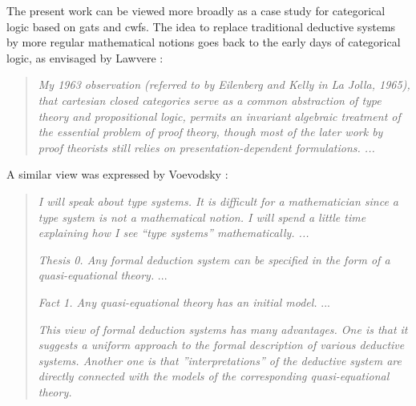 \documentclass[submission,copyright,creativecommons]{eptcs}
\newcommand{\ERASER}[1]{}
\begin{document}
The present work can be viewed more broadly as a case study for categorical logic based on gats and cwfs. The idea to replace traditional deductive systems by more regular mathematical notions goes back to the early days of categorical logic, as envisaged by Lawvere \cite{lawvere:tac-adjointness}:
\begin{quotation}
\emph{
My 1963 observation (referred to by Eilenberg and Kelly in La Jolla, 1965), that cartesian closed categories serve as a common abstraction of type theory and propositional
logic, permits an invariant algebraic treatment of the essential problem of proof theory,
though most of the later work by proof theorists still relies on presentation-dependent
formulations. ...
}
\end{quotation}
A similar view was expressed by Voevodsky \cite{voevodsky:cmu2010}:
\begin{quotation}
\emph{
I will speak about type systems. It is diﬃcult for a mathematician since
a type system is not a mathematical notion. I will spend a little time
explaining how I see ``type systems” mathematically. ...}

\emph{Thesis 0. Any formal deduction system can be specified in the form of a
quasi-equational theory.} ...

\emph{Fact 1. Any quasi-equational theory has an initial model.} ...

\emph{This view of formal deduction systems has many advantages. One is that it
suggests a uniform approach to the formal description of various deductive
systems. Another one is that ”interpretations” of the deductive system are
directly connected with the models of the corresponding quasi-equational
theory.}
\end{quotation}
\ERASER{\todo[inline]{Already here we could say: we pursue a variant of Voevodsky's approach: we will use gats rather than quasi-equational theories, and we will use cwfs rather than the C-systems (contextual categories). Gats and cwfs are intimately connected ... cwfs (and variants) are suitable for a uniform approach to deductive logical systems.
After mentioning the initiality conjecture project we could mention our generic construction of an initial model of a gat.}}
\end{document}
